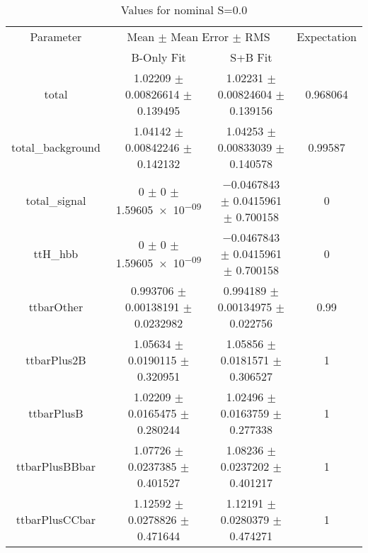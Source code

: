 \begin{table}
\centering
\caption{Values for nominal S=0.0}
\begin{tabular}{cccc}
\toprule
Parameter & \multicolumn{2}{c}{Mean $\pm$ Mean Error $\pm$ RMS} & Expectation\\
 & B-Only Fit & S+B Fit & \\
\midrule
total & \num{1.02209} $\pm$ \num{0.00826614} $\pm$ \num{0.139495} & \num{1.02231} $\pm$ \num{0.00824604} $\pm$ \num{0.139156} & \num{0.968064}\\
total\_background & \num{1.04142} $\pm$ \num{0.00842246} $\pm$ \num{0.142132} & \num{1.04253} $\pm$ \num{0.00833039} $\pm$ \num{0.140578} & \num{0.99587}\\
total\_signal & \num{0} $\pm$ \num{0} $\pm$ \num{1.59605e-09} & \num{-0.0467843} $\pm$ \num{0.0415961} $\pm$ \num{0.700158} & \num{0}\\
ttH\_hbb & \num{0} $\pm$ \num{0} $\pm$ \num{1.59605e-09} & \num{-0.0467843} $\pm$ \num{0.0415961} $\pm$ \num{0.700158} & \num{0}\\
ttbarOther & \num{0.993706} $\pm$ \num{0.00138191} $\pm$ \num{0.0232982} & \num{0.994189} $\pm$ \num{0.00134975} $\pm$ \num{0.022756} & \num{0.99}\\
ttbarPlus2B & \num{1.05634} $\pm$ \num{0.0190115} $\pm$ \num{0.320951} & \num{1.05856} $\pm$ \num{0.0181571} $\pm$ \num{0.306527} & \num{1}\\
ttbarPlusB & \num{1.02209} $\pm$ \num{0.0165475} $\pm$ \num{0.280244} & \num{1.02496} $\pm$ \num{0.0163759} $\pm$ \num{0.277338} & \num{1}\\
ttbarPlusBBbar & \num{1.07726} $\pm$ \num{0.0237385} $\pm$ \num{0.401527} & \num{1.08236} $\pm$ \num{0.0237202} $\pm$ \num{0.401217} & \num{1}\\
ttbarPlusCCbar & \num{1.12592} $\pm$ \num{0.0278826} $\pm$ \num{0.471644} & \num{1.12191} $\pm$ \num{0.0280379} $\pm$ \num{0.474271} & \num{1}\\
\bottomrule
\end{tabular}
\end{table}